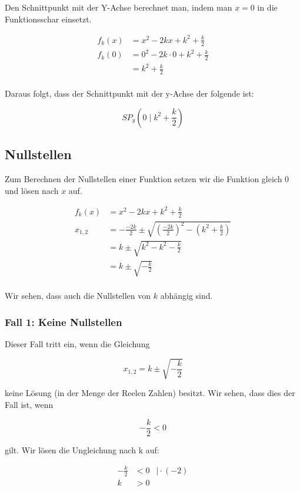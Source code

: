 \documentclass[12pt,a4paper]{article}
\begin{document}
Den Schnittpunkt mit der Y-Achse berechnet man, indem man $x=0$ in die Funktionsschar einsetzt. 

$$
\begin{aligned}
    f_k(x)&= x^2 - 2kx + k^2 + \frac{k}{2} \\
    f_k(0)&= 0^2 - 2k \cdot 0 + k^2 + \frac{k}{2} \\
    &= k^2 + \frac{k}{2} \\
\end{aligned}
$$

Daraus folgt, dass der Schnittpunkt mit der y-Achse der folgende ist:

$$
\label{eq:spy}
SP_y(0 \mid k^2 + \frac{k}{2})
$$

\subsection {Nullstellen}

Zum Berechnen der Nullstellen einer Funktion setzen wir die Funktion gleich 0 und lösen nach $x$ auf.

$$
\begin{aligned}
    f_k(x)&= x^2 - 2kx + k^2 + \frac{k}{2} \\
    x_{1,2} &= -\frac{-2k}{2} \pm \sqrt{(\frac{-2k}{2})^2 - (k^2 + \frac{k}{2})} \\
    &= k \pm \sqrt{k^2 - k^2 - \frac{k}{2}} \\
    &= k \pm \sqrt{- \frac{k}{2}} \\
\end{aligned}
$$

Wir sehen, dass auch die Nullstellen von $k$ abhängig sind.

\subsubsection{Fall 1: Keine Nullstellen}

Dieser Fall tritt ein, wenn die Gleichung 

$$ x_{1,2} = k \pm \sqrt {-\frac{k}{2}} $$

keine Lösung (in der Menge der Reelen Zahlen) besitzt. Wir sehen, dass dies der Fall ist, wenn

$$ -\frac{k}{2} < 0 $$

gilt. Wir lösen die Ungleichung nach k auf:

$$ 
\begin{aligned}
    -\frac k 2 &< 0 & \mid \cdot (-2) \\
    k &> 0 
\end{aligned}
$$
\end{document}
